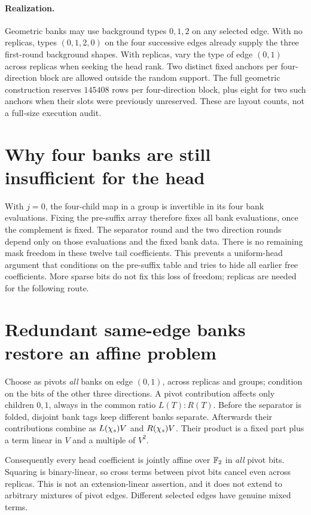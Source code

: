 \documentclass[11pt]{article}
\begin{document}
\paragraph{Realization.} Geometric banks may use background types $0,1,2$ on any selected edge. With no replicas, types $(0,1,2,0)$ on the four successive edges already supply the three first-round background shapes. With replicas, vary the type of edge $(0,1)$ across replicas when seeking the head rank. Two distinct fixed anchors per four-direction block are allowed outside the random support. The full geometric construction reserves $145408$ rows per four-direction block, plus eight for two such anchors when their slots were previously unreserved. These are layout counts, not a full-size execution audit.

\section{Why four banks are still insufficient for the head}

With $j=0$, the four-child map in a group is invertible in its four bank evaluations. Fixing the pre-suffix array therefore fixes all bank evaluations, once the complement is fixed. The separator round and the two direction rounds depend only on those evaluations and the fixed bank data. There is no remaining mask freedom in these twelve tail coefficients. This prevents a uniform-head argument that conditions on the pre-suffix table and tries to hide all earlier free coefficients. More sparse bits do not fix this loss of freedom; replicas are needed for the following route.

\section{Redundant same-edge banks restore an affine problem}

Choose as pivots \emph{all} banks on edge $(0,1)$, across replicas and groups; condition on the bits of the other three directions. A pivot contribution affects only children $0,1$, always in the common ratio $L(T):R(T)$. Before the separator is folded, disjoint bank tags keep different banks separate. Afterwards their contributions combine as $L(\chi_s)V$ and $R(\chi_s)V$. Their product is a fixed part plus a term linear in $V$ and a multiple of $V^2$.

Consequently every head coefficient is jointly affine over $\mathbb{F}_2$ in \emph{all} pivot bits. Squaring is binary-linear, so cross terms between pivot bits cancel even across replicas. This is not an extension-linear assertion, and it does not extend to arbitrary mixtures of pivot edges. Different selected edges have genuine mixed terms.
\end{document}
